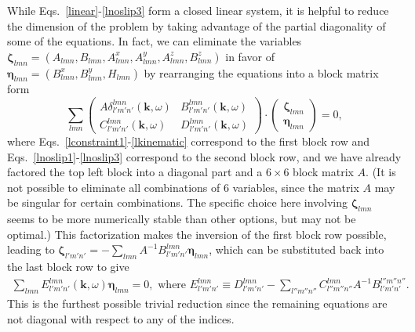 \documentclass[aps,pre,amsmath,amssymb,floatfix,onecolumn,notitlepage,10pt]{revtex4-1}
\begin{document}
While Eqs.~\eqref{linear}-\eqref{lnoslip3} form a closed linear system, it is helpful to reduce the dimension of the problem by taking advantage of the partial diagonality of some of the equations.  In fact, we can eliminate the variables $\bm{\zeta}_{lmn}=(A_{lmn},B_{lmn},A^x_{lmn},A^y_{lmn},A^z_{lmn},B^z_{lmn})$ in favor of $\bm{\eta}_{lmn}=(B^x_{lmn},B^y_{lmn},H_{lmn})$ by rearranging the equations into a block matrix form
\begin{equation}
\sum_{lmn} \begin{pmatrix} A\delta^{lmn}_{l'm'n'}(\mathbf{k},\omega) & B^{lmn}_{l'm'n'}(\mathbf{k},\omega) \\ C^{lmn}_{l'm'n'}(\mathbf{k},\omega) & D^{lmn}_{l'm'n'}(\mathbf{k},\omega) \end{pmatrix} \cdot \begin{pmatrix} \bm{\zeta}_{lmn} \\ \bm{\eta}_{lmn}\end{pmatrix} = 0,
\end{equation}
where Eqs.~\eqref{lconstraint1}-\eqref{lkinematic} correspond to the first block row and Eqs.~\eqref{lnoslip1}-\eqref{lnoslip3} correspond to the second block row, and we have already factored the top left block into a diagonal part and a $6\times 6$ block matrix $A$.  (It is not possible to eliminate all combinations of $6$ variables, since the matrix $A$ may be singular for certain combinations. The specific choice here involving $\bm{\zeta}_{lmn}$ seems to be more numerically stable than other options, but may not be optimal.) This factorization makes the inversion of the first block row possible, leading to $\bm{\zeta}_{l'm'n'} =- \sum_{lmn} A^{-1} B^{lmn}_{l'm'n'}\bm{\eta}_{lmn}$, which can be substituted back into the last block row to give
\begin{align}
\sum_{lmn} E_{l'm'n'}^{lmn}(\mathbf{k},\omega) \bm{\eta}_{lmn} = 0, \text{ where } E_{l'm'n'}^{lmn} \equiv D^{lmn}_{l'm'n'} - \sum_{l''m''n''} C^{lmn}_{l''m''n''}A^{-1}B^{l''m''n''}_{l'm'n'}. \label{neigen}
\end{align}
This is the furthest possible trivial reduction since the remaining equations are not diagonal with respect to any of the indices.
\end{document}
